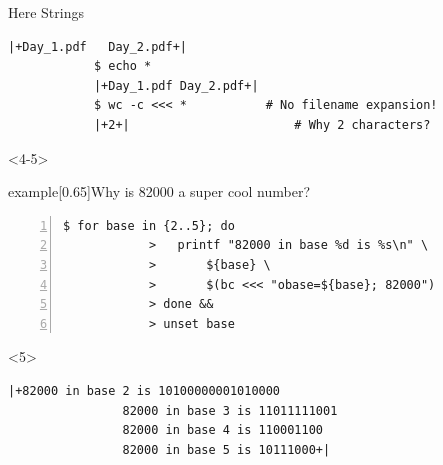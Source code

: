 \begin{frame}[fragile]{Here Strings}
\begin{onlyenv}
\begin{lstlisting}[style=MyBash, aboveskip=0mm, style=oddnumbers]
            |+Day_1.pdf   Day_2.pdf+|
            $ echo *
            |+Day_1.pdf Day_2.pdf+|
            $ wc -c <<< *           # No filename expansion!
            |+2+|                       # Why 2 characters?
        \end{lstlisting}
    \end{onlyenv}
    \begin{onlyenv}<4-5>
        \begin{varblock}{example}[0.65\textwidth]{Why is 82000 a super cool number?}
        \end{varblock}
        \begin{lstlisting}[style=MyBash, aboveskip=0mm, numbers=left, aboveskip=4mm]
            $ for base in {2..5}; do
            >   printf "82000 in base %d is %s\n" \
            >       ${base} \
            >       $(bc <<< "obase=${base}; 82000")
            > done &&
            > unset base
        \end{lstlisting}
        \begin{uncoverenv}<5>
            \begin{lstlisting}[style=MyBash, aboveskip=0mm, numbers=none]
                |+82000 in base 2 is 10100000001010000
                82000 in base 3 is 11011111001
                82000 in base 4 is 110001100
                82000 in base 5 is 10111000+|
            \end{lstlisting}
        \end{uncoverenv}
    \end{onlyenv}
\end{frame}
